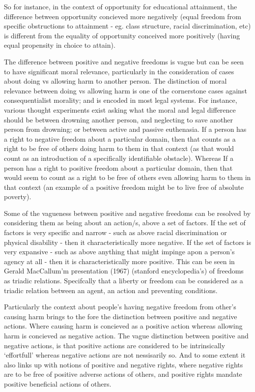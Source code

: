 \documentclass{article}
\begin{document}
So for instance, in the context of opportunity for educational attainment, the difference between opportunity concieved more negatively (equal freedom from specific obstructions to attainment - eg. class structure, racial discrimination, etc) is different from the equality of opportunity conceived more positively (having equal propensity in choice to attain).

The difference between positive and negative freedoms is vague but can be seen to have significant moral relevance, particularly in the consideration of cases about doing vs allowing harm to another person.
The distinction of moral relevance between doing vs allowing harm is one of the cornerstone cases against consequentialist morality; and is encoded in most legal systems.
For instance, various thought experiments exist asking what the moral and legal difference should be between drowning another person, and neglecting to save another person from drowning; or between active and passive euthenasia.
If a person has a right to negative freedom about a particular domain, then that counts as a right to be free of others doing harm to them in that context (as that would count as an introduction of a specifically identifiable obstacle).
Whereas If a person has a right to positive freedom about a particular domain, then that would seem to count as a right to be free of others even allowing harm to them in that context (an example of a positive freedom might be to live free of absolute poverty).

Some of the vagueness between positive and negative freedoms can be resolved by considering them as being about an action/s, above a set of factors.
If the set of factors is very specific and narrow - such as above racial discrimination or physical disability - then it characteristically more negative.
If the set of factors is very expansive - such as above anything that might impinge apon a person's agency at all - then it is characteristically more positive.
This can be seen in Gerald MacCallum'm presentation (1967) (stanford encyclopedia's) of freedoms as triadic relations. Specifcally that a liberty or freedom can be considered as a triadic relation between an agent, an action and preventing conditions.

Particularly the context about people's having negative freedom from other's causing harm brings to the fore the distinction between positive and negative actions.
Where causing harm is concieved as a positive action whereas allowing harm is concieved as negative action.
The vague distinction between positive and negative actions, is that positive actions are considered to be intrinsically `effortfull' whereas negative actions are not nessisarily so.\cite{Mossel2009} And to some extent it also links up with notions of positive and negative rights, where negative rights are to be free of positive adverse actions of others, and positive rights mandate positive beneficial actions of others.
\end{document}
